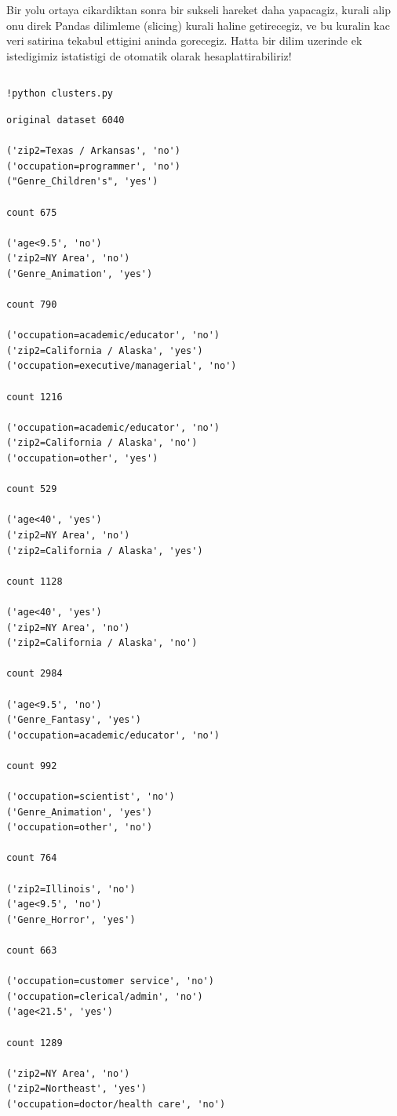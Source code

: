\documentclass[12pt,fleqn]{article}\usepackage{../common}
\begin{document}
Bir yolu ortaya cikardiktan sonra bir sukseli hareket daha yapacagiz,
kurali alip onu direk Pandas dilimleme (slicing) kurali haline getirecegiz,
ve bu kuralin kac veri satirina tekabul ettigini aninda gorecegiz. Hatta
bir dilim uzerinde ek istedigimiz istatistigi de otomatik olarak
hesaplattirabiliriz! 

\inputminted[fontsize=\footnotesize]{python}{clusters.py}

\begin{verbatim}
!python clusters.py
\end{verbatim}

\begin{verbatim}
original dataset 6040

('zip2=Texas / Arkansas', 'no')
('occupation=programmer', 'no')
("Genre_Children's", 'yes')

count 675

('age<9.5', 'no')
('zip2=NY Area', 'no')
('Genre_Animation', 'yes')

count 790

('occupation=academic/educator', 'no')
('zip2=California / Alaska', 'yes')
('occupation=executive/managerial', 'no')

count 1216

('occupation=academic/educator', 'no')
('zip2=California / Alaska', 'no')
('occupation=other', 'yes')

count 529

('age<40', 'yes')
('zip2=NY Area', 'no')
('zip2=California / Alaska', 'yes')

count 1128

('age<40', 'yes')
('zip2=NY Area', 'no')
('zip2=California / Alaska', 'no')

count 2984

('age<9.5', 'no')
('Genre_Fantasy', 'yes')
('occupation=academic/educator', 'no')

count 992

('occupation=scientist', 'no')
('Genre_Animation', 'yes')
('occupation=other', 'no')

count 764

('zip2=Illinois', 'no')
('age<9.5', 'no')
('Genre_Horror', 'yes')

count 663

('occupation=customer service', 'no')
('occupation=clerical/admin', 'no')
('age<21.5', 'yes')

count 1289

('zip2=NY Area', 'no')
('zip2=Northeast', 'yes')
('occupation=doctor/health care', 'no')


\end{verbatim}
\end{document}
